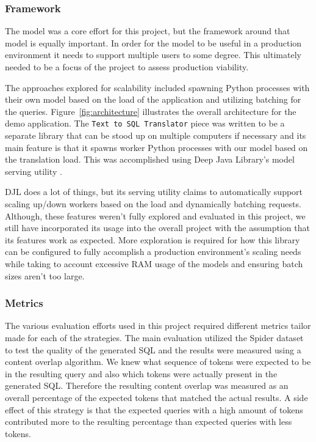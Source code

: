 \documentclass[11pt]{article}
\begin{document}
\subsubsection{Framework}

The model was a core effort for this project, but the framework around that model is equally important. In order for the model to be useful in a production environment it needs to support multiple users to some degree. This ultimately needed to be a focus of the project to assess production viability.

The approaches explored for scalability included spawning Python processes with their own model based on the load of the application and utilizing batching for the queries. Figure~\ref{fig:architecture} illustrates the overall architecture for the demo application. The \texttt{Text to SQL Translator} piece was written to be a separate library that can be stood up on multiple computers if necessary and its main feature is that it spawns worker Python processes with our model based on the translation load. This was accomplished using Deep Java Library's model serving utility \citep{djlserving}.

DJL does a lot of things, but its serving utility claims to automatically support scaling up/down workers based on the load and dynamically batching requests. Although, these features weren't fully explored and evaluated in this project, we still have incorporated its usage into the overall project with the assumption that its features work as expected. More exploration is required for how this library can be configured to fully accomplish a production environment's scaling needs while taking to account excessive RAM usage of the models and ensuring batch sizes aren't too large.

\subsubsection{Metrics}

The various evaluation efforts used in this project required different metrics tailor made for each of the strategies. The main evaluation utilized the Spider dataset to test the quality of the generated SQL and the results were measured using a content overlap algorithm. We knew what sequence of tokens were expected to be in the resulting query and also which tokens were actually present in the generated SQL. Therefore the resulting content overlap was measured as an overall percentage of the expected tokens that matched the actual results. A side effect of this strategy is that the expected queries with a high amount of tokens contributed more to the resulting percentage than expected queries with less tokens.
\end{document}
